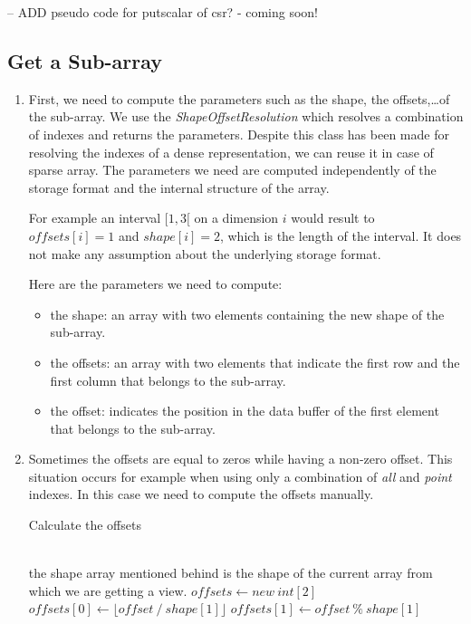 -- ADD pseudo code for putscalar of csr? - coming soon!



\subsection{Get a Sub-array}

\begin{enumerate}
\item First, we need to compute the parameters such as the shape, the offsets,\dots of the sub-array. We use the \textit{ShapeOffsetResolution} which resolves a combination of indexes and returns the parameters. Despite this class has been made for resolving the indexes of a dense representation, we can reuse it in case of sparse array. The parameters we need are computed independently of the storage format and the internal structure of the array.

For example an interval $[1, 3[$ on a dimension $i$ would result to $offsets[i] = 1$ and $shape[i] = 2$, which is the length of the interval. It does not make any assumption about the underlying storage format.

Here are the parameters we need to compute:
\begin{itemize}
	\item the shape: an array with two elements containing the new shape of the sub-array.
	\item the offsets: an array with two elements that indicate the first row and the first column that belongs to the sub-array.
	\item the offset: indicates the position in the data buffer of the first element that belongs to the sub-array.
\end{itemize}
 \item Sometimes the offsets are equal to zeros while having a non-zero offset. This situation occurs for example when using only a combination of \textit{all} and \textit{point} indexes. In this case we need to compute the offsets manually.
  
 \begin{algorithm}
 	\caption{Calculate the offsets}
 	\label{alg:sparseOffsets2d}
 	\begin{algorithmic}
 		\\
 		\Comment the shape array mentioned behind is the shape of the current array from which we are getting a view.
	 		\State $offsets \gets new\ int[2]$
	 		\State $offsets[0] \gets \lfloor offset\ /\ shape[1]\rfloor$
	 		\State $offsets[1] \gets offset\ \%\ shape[1]$
 		\EndProcedure
 	\end{algorithmic}
 \end{algorithm}
 

\end{enumerate}
